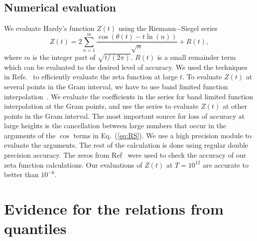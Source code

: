 \documentclass[twoside]{article}
\begin{document}
\subsection{\label{numerics}Numerical evaluation}


We evaluate Hardy's function $Z(t)$  using the Riemann$-$Siegel series
\begin{equation}
Z(t) = 2\sum^{m}_{n=1}\frac{\cos(\theta(t) - t \ln (n))}{\sqrt{n}} + R(t), 
\label{eq:RS}
\end{equation}
where $m$ is the integer part of $\sqrt{t/(2\pi)}$. $R(t)$ is a small remainder
term which can be evaluated to the desired level of accuracy. We used the techniques in
 Refs.~\cite{Odlyzko 1992,hiary,gourdon} 
to efficiently evaluate the zeta function at large $t$. To evaluate  $Z(t)$  at several points 
in the Gram interval, we have to use band limited function interpolation~\cite{Jerri 1977}. 
We evaluate the coefficients in the series for band limited function interpolation at the Gram points, 
and use the series to evaluate $Z(t)$ at other points in the Gram interval. The most important 
source for loss of accuracy at large heights is the cancellation between
large numbers that occur in the arguments of the $\cos$ terms in Eq.~(\ref{eq:RS}). We 
use a high precision module to evaluate the arguments. The rest of the calculation
is done using regular double precision accuracy. The  zeros from Ref~\cite{hiary 2010} 
were used 
to check the accuracy of our zeta function calculations. 
Our evaluations of $Z(t)$ at $T=10^{12}$ 
are accurate 
to better than $10^{-6}$. 


\section{\label{sec4}Evidence for the relations from quantiles}
  
\end{document}
